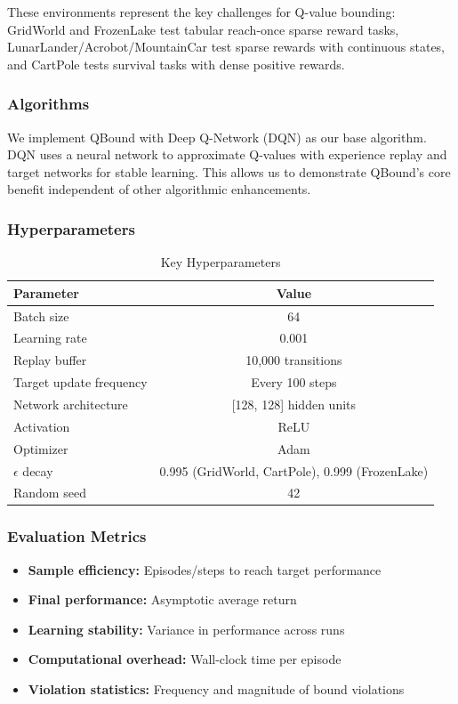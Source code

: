 \documentclass[11pt]{article}
\theoremstyle{definition}
\theoremstyle{remark}
\begin{document}
These environments represent the key challenges for Q-value bounding: GridWorld and FrozenLake test tabular reach-once sparse reward tasks, LunarLander/Acrobot/MountainCar test sparse rewards with continuous states, and CartPole tests survival tasks with dense positive rewards.

\subsubsection{Algorithms}

We implement QBound with Deep Q-Network (DQN) \citep{mnih2015human} as our base algorithm. DQN uses a neural network to approximate Q-values with experience replay and target networks for stable learning. This allows us to demonstrate QBound's core benefit independent of other algorithmic enhancements.

\subsubsection{Hyperparameters}

\begin{table}[h]
\centering
\caption{Key Hyperparameters}
\small
\begin{tabular}{@{}lc@{}}
\toprule
\textbf{Parameter} & \textbf{Value} \\
\midrule
Batch size & 64 \\
Learning rate & 0.001 \\
Replay buffer & 10,000 transitions \\
Target update frequency & Every 100 steps \\
Network architecture & [128, 128] hidden units \\
Activation & ReLU \\
Optimizer & Adam \\
$\epsilon$ decay & 0.995 (GridWorld, CartPole), 0.999 (FrozenLake) \\
Random seed & 42 \\
\bottomrule
\end{tabular}
\end{table}

\subsubsection{Evaluation Metrics}

\begin{itemize}
    \item \textbf{Sample efficiency:} Episodes/steps to reach target performance
    \item \textbf{Final performance:} Asymptotic average return
    \item \textbf{Learning stability:} Variance in performance across runs
    \item \textbf{Computational overhead:} Wall-clock time per episode
    \item \textbf{Violation statistics:} Frequency and magnitude of bound violations
\end{itemize}
\end{document}
